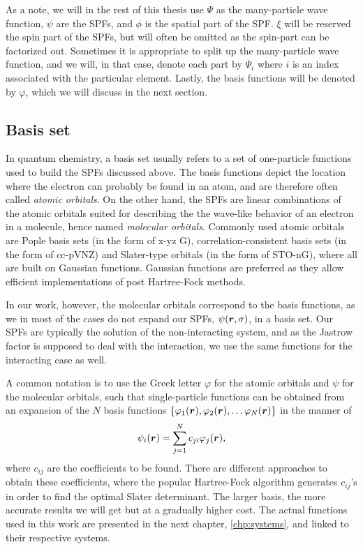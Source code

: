 As a note, we will in the rest of this thesis use $\Psi$ as the many-particle wave function, $\psi$ are the SPFs, and $\phi$ is the spatial part of the SPF. $\xi$ will be reserved the spin part of the SPFs, but will often be omitted as the spin-part can be factorized out. Sometimes it is appropriate to split up the many-particle wave function, and we will, in that case, denote each part by $\Psi_i$ where $i$ is an index associated with the particular element. Lastly, the basis functions will be denoted by $\varphi$, which we will discuss in the next section.

\subsection{Basis set} \label{sec:basisset}
In quantum chemistry, a basis set usually refers to a set of one-particle functions used to build the SPFs discussed above. The basis functions depict the location where the electron can probably be found in an atom, and are therefore often called \textit{atomic orbitals}. On the other hand, the SPFs are linear combinations of the atomic orbitals suited for describing the the wave-like behavior of an electron in a molecule, hence named \textit{molecular orbitals}. Commonly used atomic orbitals are Pople basis sets \cite{ditchfield_self-consistent_1971} (in the form of x-yz G), correlation-consistent basis sets \cite{dunning_gaussian_1989} (in the form of cc-pVNZ) and Slater-type orbitals \cite{slater_atomic_1930} (in the form of STO-nG), where all are built on Gaussian functions. Gaussian functions are preferred as they allow efficient implementations of post Hartree-Fock methods.

In our work, however, the molecular orbitals correspond to the basis functions, as we in most of the cases do not expand our SPFs, $\psi(\boldsymbol{{r}},\sigma)$, in a basis set. Our SPFs are typically the solution of the non-interacting system, and as the Jastrow factor is supposed to deal with the interaction, we use the same functions for the interacting case as well.

A common notation is to use the Greek letter $\varphi$ for the atomic orbitals and $\psi$ for the molecular orbitals, such that single-particle functions can be obtained from an expansion of the $N$ basis functions $\{\varphi_1(\boldsymbol{{r}}),\varphi_2(\boldsymbol{{r}}),\hdots\varphi_N(\boldsymbol{{r}})\}$ in the manner of
\begin{equation}
\psi_i(\boldsymbol{{r}})=\sum_{j=1}^Nc_{ji}\varphi_j(\boldsymbol{{r}}),
\label{eq:expansion}
\end{equation}
where $c_{ij}$ are the coefficients to be found. There are different approaches to obtain these coefficients, where the popular Hartree-Fock algorithm generates $c_{ij}$'s in order to find the optimal Slater determinant. The larger basis, the more accurate results we will get but at a gradually higher cost. The actual functions used in this work are presented in the next chapter, \ref{chp:systems}, and linked to their respective systems. 

